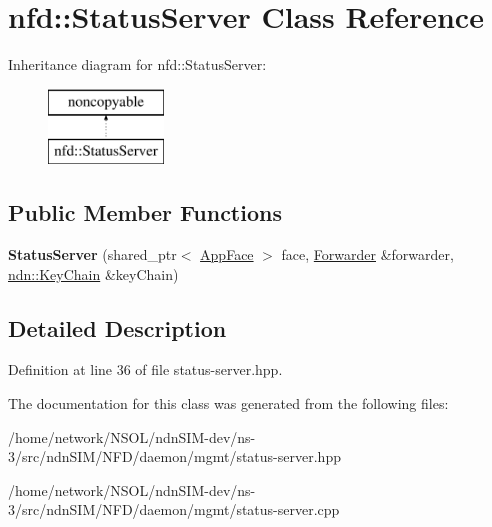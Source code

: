 \hypertarget{classnfd_1_1StatusServer}{}\section{nfd\+:\+:Status\+Server Class Reference}
\label{classnfd_1_1StatusServer}
Inheritance diagram for nfd\+:\+:Status\+Server\+:\begin{figure}[H]
\begin{center}
\leavevmode
\includegraphics[height=2.000000cm]{classnfd_1_1StatusServer}
\end{center}
\end{figure}
\subsection*{Public Member Functions}
\begin{DoxyCompactItemize}
\item 
{\bfseries Status\+Server} (shared\+\_\+ptr$<$ \hyperlink{classnfd_1_1AppFace}{App\+Face} $>$ face, \hyperlink{classnfd_1_1Forwarder}{Forwarder} \&forwarder, \hyperlink{classndn_1_1security_1_1KeyChain}{ndn\+::\+Key\+Chain} \&key\+Chain)\hypertarget{classnfd_1_1StatusServer_a6dcb3367348738e90f60e8fe69152257}{}\label{classnfd_1_1StatusServer_a6dcb3367348738e90f60e8fe69152257}

\end{DoxyCompactItemize}


\subsection{Detailed Description}


Definition at line 36 of file status-\/server.\+hpp.



The documentation for this class was generated from the following files\+:\begin{DoxyCompactItemize}
\item 
/home/network/\+N\+S\+O\+L/ndn\+S\+I\+M-\/dev/ns-\/3/src/ndn\+S\+I\+M/\+N\+F\+D/daemon/mgmt/status-\/server.\+hpp\item 
/home/network/\+N\+S\+O\+L/ndn\+S\+I\+M-\/dev/ns-\/3/src/ndn\+S\+I\+M/\+N\+F\+D/daemon/mgmt/status-\/server.\+cpp\end{DoxyCompactItemize}
